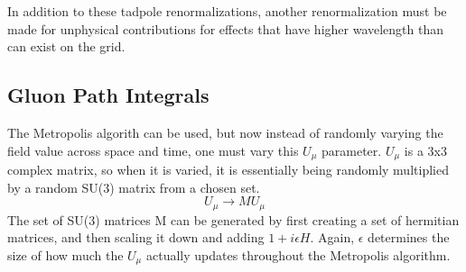 \documentclass{article}
\begin{document}
In addition to these tadpole renormalizations, another renormalization must be made for unphysical contributions for effects that have higher wavelength than can exist on the grid. 

\subsection{Gluon Path Integrals}
The Metropolis algorith can be used, but now instead of randomly varying the field value across space and time, one must vary this $U_{\mu}$ parameter.
$U_{\mu}$ is a 3x3 complex matrix, so when it is varied, it is essentially being randomly multiplied by a random SU(3) matrix from a chosen set.
\begin{equation}
    U_{\mu} \rightarrow MU_{\mu}
\end{equation}
The set of SU(3) matrices M can be generated by first creating a set of hermitian matrices, and then scaling it down and adding $1 + i\epsilon H$. Again, $\epsilon$ determines the size of how much the $U_{\mu}$ actually updates throughout the Metropolis algorithm.
\end{document}
